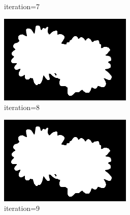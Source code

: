 \documentclass{article}
\begin{document}
\begin{figure}[t]
\begin{subfigure}[t]{0.19\textwidth}
\vspace{-0.6cm}
\caption{iteration=7}
\end{subfigure}
\begin{subfigure}[t]{0.19\textwidth}
\centering
\includegraphics[width=\textwidth]{./images/marginals_iter_8.png}
\vspace{-0.6cm}
\caption{iteration=8}
\end{subfigure}
\begin{subfigure}[t]{0.19\textwidth}
\centering
\includegraphics[width=\textwidth]{./images/marginals_iter_9.png}
\vspace{-0.6cm}
\caption{iteration=9}
\end{subfigure}
\begin{subfigure}[t]{0.19\textwidth}
\centering

\end{subfigure}
\end{figure}
\end{document}
